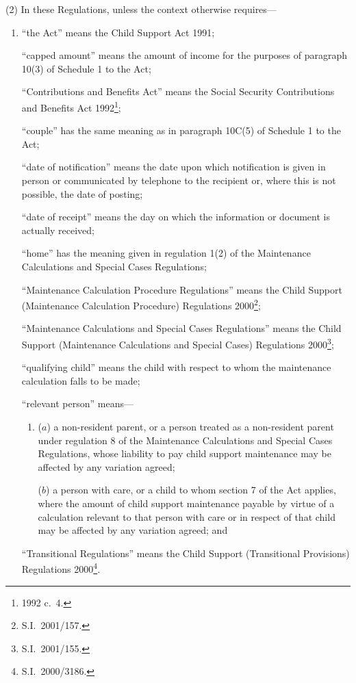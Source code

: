 \documentclass[12pt,a4paper]{article}
\begin{document}
(2) In these Regulations, unless the context otherwise requires—
\begin{enumerate}\item[]
“the Act” means the Child Support Act 1991;

“capped amount” means the amount of income for the purposes of paragraph 10(3) of Schedule 1 to the Act;

“Contributions and Benefits Act” means the Social Security Contributions and Benefits Act 1992\footnote{1992 c.\ 4.};

“couple” has the same meaning as in paragraph 10C(5) of Schedule 1 to the Act;

“date of notification” means the date upon which notification is given in person or communicated by telephone to the recipient or, where this is not possible, the date of posting;

“date of receipt” means the day on which the information or document is actually received;

“home” has the meaning given in regulation 1(2) of the Maintenance Calculations and Special Cases Regulations;

“Maintenance Calculation Procedure Regulations” means the Child Support (Maintenance Calculation Procedure) Regulations 2000\footnote{S.I.\ 2001/157.};

“Maintenance Calculations and Special Cases Regulations” means the Child Support (Maintenance Calculations and Special Cases) Regulations 2000\footnote{S.I.\ 2001/155.};

“qualifying child” means the child with respect to whom the maintenance calculation falls to be made;

“relevant person” means—
\begin{enumerate}\item[]
($a$) 
a non-resident parent, or a person treated as a non-resident parent under regulation 8 of the Maintenance Calculations and Special Cases Regulations, whose liability to pay child support maintenance may be affected by any variation agreed;

($b$) 
a person with care, or a child to whom section 7 of the Act applies, where the amount of child support maintenance payable by virtue of a calculation relevant to that person with care or in respect of that child may be affected by any variation agreed; and
\end{enumerate}

“Transitional Regulations” means the Child Support (Transitional Provisions) Regulations 2000\footnote{S.I.\ 2000/3186.}.
\end{enumerate}
\end{document}

